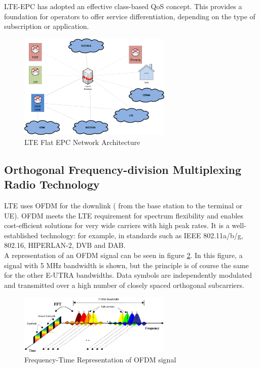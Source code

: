 LTE-EPC has adopted an effective class-based QoS concept. This provides a
foundation for operators to offer service differentiation, depending on the type
of subscription or application.

\begin{figure}[htbp]
    \centering
    \includegraphics[width=0.65\textwidth]{./figures/lte_flatepc}
    \caption{ LTE Flat EPC Network Architecture
    \label{fig:lteflatepc}}
\end{figure}

\subsection{Orthogonal Frequency-division Multiplexing Radio Technology} %

LTE uses OFDM for the downlink ( from the base station to the terminal or UE).
OFDM meets the LTE requirement for spectrum flexibility and enables cost-efficient
solutions for very wide carriers with high peak rates. It is a well-established
technology: for example, in standards such as IEEE 802.11a/b/g, 802.16, HIPERLAN-2,
DVB and DAB.\cite{introlte} \cite{umtslte}\\

A representation of an OFDM signal can be seen in figure \ref{fig:ofdmfreq}. In
this figure, a signal with 5 MHz bandwidth is shown, but the principle is of
course the same for the other E-UTRA bandwidths. Data symbols are independently
modulated and transmitted over a high number of closely spaced orthogonal
subcarriers.

\begin{figure}[htbp]
    \centering
    \includegraphics[width=0.65\textwidth]{./figures/ofdm_frequency}
    \caption{ Frequency-Time Representation of OFDM signal
    \label{fig:ofdmfreq}}
\end{figure}

